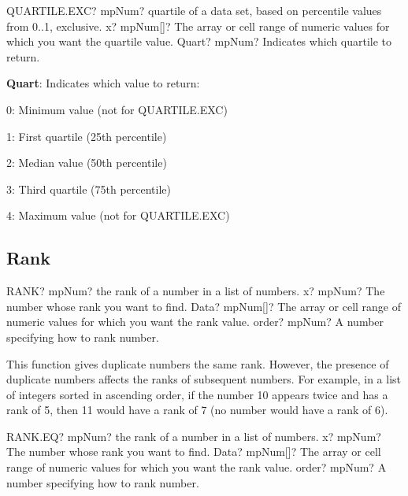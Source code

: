 \vspace{0.6cm}
\begin{mpFunctionsExtract}
	\mpWorksheetFunctionTwoNotImplemented
	{QUARTILE.EXC? mpNum? quartile of a data set, based on percentile values from 0..1, exclusive.}
	{x? mpNum[]?  The array or cell range of numeric values for which you want the quartile value.}
	{Quart? mpNum? Indicates which quartile to return.}
\end{mpFunctionsExtract}

\textbf{\textsf{Quart}}: Indicates which value to return:

0: Minimum value (not for \textsf{QUARTILE.EXC})

1: First quartile (25th percentile) 

2: Median value (50th percentile) 

3: Third quartile (75th percentile) 

4: Maximum value (not for \textsf{QUARTILE.EXC})





\subsection{Rank}

\begin{mpFunctionsExtract}
	\mpWorksheetFunctionThreeNotImplemented
	{RANK? mpNum? the rank of a number in a list of numbers.}
	{x? mpNum? The number whose rank you want to find.}
	{Data? mpNum[]?  The array or cell range of numeric values for which you want the rank value.}
	{order? mpNum? A number specifying how to rank number.}
\end{mpFunctionsExtract}

\vspace{0.3cm}
This function gives duplicate numbers the same rank. However, the presence of duplicate numbers affects the ranks of subsequent numbers. For example, in a list of integers sorted in ascending order, if the number 10 appears twice and has a rank of 5, then 11 would have a rank of 7 (no number would have a rank of 6).


\vspace{0.6cm}
\begin{mpFunctionsExtract}
	\mpWorksheetFunctionThreeNotImplemented
	{RANK.EQ? mpNum? the rank of a number in a list of numbers.}
	{x? mpNum? The number whose rank you want to find.}
	{Data? mpNum[]?  The array or cell range of numeric values for which you want the rank value.}
	{order? mpNum? A number specifying how to rank number.}
\end{mpFunctionsExtract}

